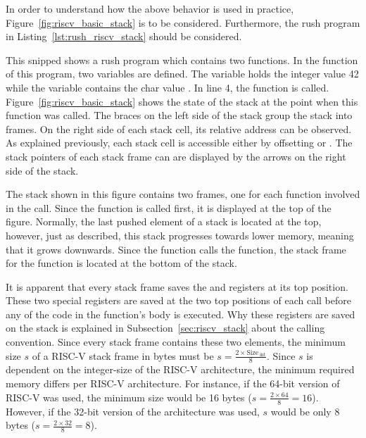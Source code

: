 In order to understand how the above behavior is used in practice, Figure~\ref{fig:riscv_basic_stack} is to be considered.
Furthermore, the rush program in Listing~\ref{lst:rush_riscv_stack} should be considered.


This snipped shows a rush program which contains two functions.
In the  function of this program, two variables are defined.
The  variable holds the integer value 42 while the  variable contains the char value .
In line 4, the  function is called.
Figure~\ref{fig:riscv_basic_stack} shows the state of the stack at the point when this function was called.
The braces on the left side of the stack group the stack into frames.
On the right side of each stack cell, its relative address can be observed.
As explained previously, each stack cell is accessible either by offsetting 
or . The stack pointers of each stack frame can are displayed by the arrows on the right side of the stack.

The stack shown in this figure contains two frames, one for each function involved in the call.
Since the  function is called first, it is displayed at the top of the figure.
Normally, the last pushed element of a stack is located at the top, however, just as described,
this stack progresses towards lower memory, meaning that it grows downwards.
Since the  function calls the  function, the stack frame for the  function is located at the bottom of the stack.

It is apparent that every stack frame saves the  and  registers at its top position.
These two special registers are saved at the two top positions of each call before any of the code in the function's body is executed.
Why these registers are saved on the stack is explained in Subsection~\ref{sec:riscv_stack} about the calling convention.
Since every stack frame contains these two elements,
the minimum size $s$ of a RISC-V stack frame in bytes must be $s = \frac{2 \times \text{Size}\,_\text{int}}{8}$.
Since $s$ is dependent on the integer-size of the RISC-V architecture, the minimum required memory differs per RISC-V architecture.
For instance, if the 64-bit version of RISC-V was used, the minimum size would be 16 bytes ($s = \frac{2 \times 64}{8} = 16$).
However, if the 32-bit version of the architecture was used, $s$ would be only 8 bytes ($s = \frac{2 \times 32}{8} = 8$).


